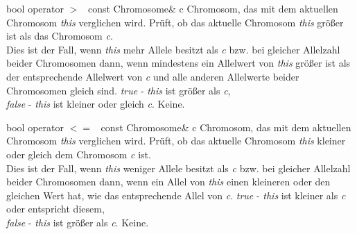 \documentclass{report}
\begin{document}
    \setConstInstance
    \printMethodWithOneParam
        {bool}  
        {operator $>$\ } 
        {const Chromosome\&}
        {c} 
        {Chromosom, das mit dem aktuellen Chromosom {\em this}
         verglichen wird.}
        {Pr\"uft, ob das aktuelle Chromosom {\em this}
         gr\"o{\ss}er ist als das Chromosom {\em c}.\\
         Dies ist der Fall, wenn {\em this} mehr Allele
         besitzt als {\em c} bzw. bei gleicher Allelzahl beider Chromosomen
         dann, wenn mindestens ein Allelwert von {\em this} gr\"o{\ss}er ist
         als der entsprechende Allelwert von {\em c} und alle anderen
         Allelwerte beider Chromosomen gleich sind.}
        {
         {\em true}\hspace{2pt} - {\em this} ist gr\"o{\ss}er als {\em c},\\
         {\em false} - {\em this} ist kleiner oder gleich {\em c}.}
        {Keine.}

\vspace{4ex}

    \setConstInstance
    \printMethodWithOneParam
        {bool}  
        {operator $<=$\ } 
        {const Chromosome\&}
        {c} 
        {Chromosom, das mit dem aktuellen Chromosom {\em this}
         verglichen wird.}
        {Pr\"uft, ob das aktuelle Chromosom {\em this}
         kleiner oder gleich dem Chromosom {\em c} ist.\\
         Dies ist der Fall, wenn {\em this} weniger Allele
         besitzt als {\em c} bzw. bei gleicher Allelzahl beider Chromosomen
         dann, wenn ein Allel von {\em this} einen kleineren oder den 
         gleichen Wert hat, wie das entsprechende Allel von {\em c}.}
        {
         {\em true}\hspace{2pt} - {\em this} ist kleiner als {\em c} oder
                                  entspricht diesem,\\
         {\em false} - {\em this} ist gr\"o{\ss}er als {\em c}.}
        {Keine.}

\vspace{4ex}
\end{document}
